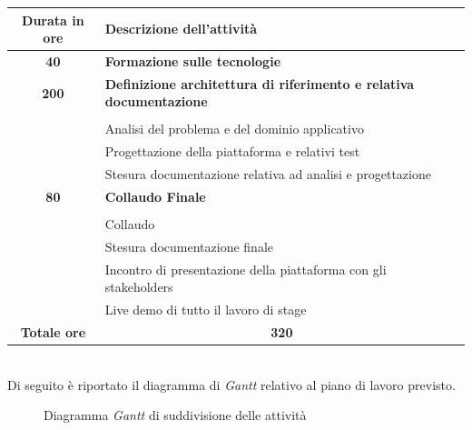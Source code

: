     \begin{tabularx}{\textwidth}{|c|X|}
        \hline
        \textbf{Durata in ore} & \textbf{Descrizione dell'attività} \\ \hline
        
        \textbf{40} & \textbf{Formazione sulle tecnologie} \\	 
        \hline
        
        \textbf{200} & \textbf{Definizione architettura di riferimento e relativa documentazione} \\ \hdashline 
        \multirow{3}{0cm}\\ 
         & 
        {Analisi del problema e del dominio applicativo} \\
         & 
        {Progettazione della piattaforma e relativi test} \\
         & 
        {Stesura documentazione relativa ad analisi e progettazione} \\
        \hline
        
        \textbf{80} & \textbf{Collaudo Finale}  \\ \hdashline 
        \multirow{4}{0cm}\\ 
         & 
        {Collaudo} \\
         & 
        {Stesura documentazione finale} \\
         & 
        {Incontro di presentazione della piattaforma con gli stakeholders} \\
         & 
        {Live demo di tutto il lavoro di stage} \\
        \hline
        
        \textbf{Totale ore} & \multicolumn{1}{|c|}{\textbf{320}} \\ \hline
        
    \end{tabularx} \\
    
    Di seguito è riportato il diagramma di \textit{Gantt} relativo al piano di lavoro previsto.
    \begin{figure}[H]
        \caption[Diagramma \textit{Gantt} di suddivisione delle attività]{Diagramma \textit{Gantt} di suddivisione delle attività}
    \end{figure}


